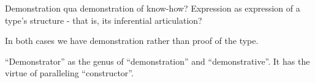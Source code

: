 \begin{ednote}
  Demonstration qua demonstration of know-how?  Expression as
  expression of a type's structure - that is, its inferential
  articulation?
\end{ednote}

In both cases we have demonstration rather than proof of the type.

\begin{ednote}
  ``Demonstrator'' as the genus of ``demonstration'' and
  ``demonstrative''.  It has the virtue of paralleling
  ``constructor''.
\end{ednote}
